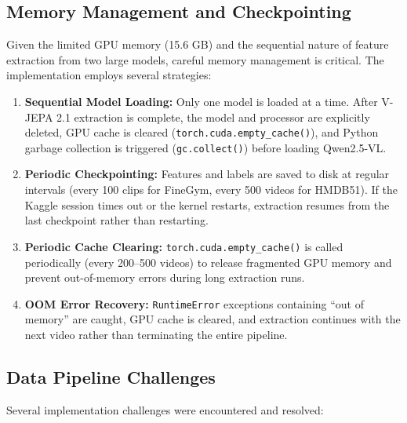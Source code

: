 \subsection{Memory Management and Checkpointing}

Given the limited GPU memory (15.6 GB) and the sequential nature of feature extraction from two large models, careful memory management is critical. The implementation employs several strategies:

\begin{enumerate}[leftmargin=*]
    \item \textbf{Sequential Model Loading:} Only one model is loaded at a time. After V-JEPA 2.1 extraction is complete, the model and processor are explicitly deleted, GPU cache is cleared (\texttt{torch.cuda.empty\_cache()}), and Python garbage collection is triggered (\texttt{gc.collect()}) before loading Qwen2.5-VL.
    \item \textbf{Periodic Checkpointing:} Features and labels are saved to disk at regular intervals (every 100 clips for FineGym, every 500 videos for HMDB51). If the Kaggle session times out or the kernel restarts, extraction resumes from the last checkpoint rather than restarting.
    \item \textbf{Periodic Cache Clearing:} \texttt{torch.cuda.empty\_cache()} is called periodically (every 200--500 videos) to release fragmented GPU memory and prevent out-of-memory errors during long extraction runs.
    \item \textbf{OOM Error Recovery:} \texttt{RuntimeError} exceptions containing ``out of memory'' are caught, GPU cache is cleared, and extraction continues with the next video rather than terminating the entire pipeline.
\end{enumerate}

\subsection{Data Pipeline Challenges}

Several implementation challenges were encountered and resolved:


